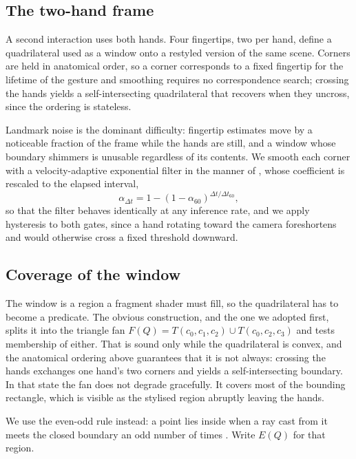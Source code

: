 \documentclass{article}
\theoremstyle{definition}
\begin{document}
\subsection{The two-hand frame}
\label{sec:frame}

A second interaction uses both hands. Four fingertips, two per hand, define a
quadrilateral used as a window onto a restyled version of the same scene. Corners
are held in anatomical order, so a corner corresponds to a fixed fingertip for
the lifetime of the gesture and smoothing requires no correspondence search;
crossing the hands yields a self-intersecting quadrilateral that recovers when
they uncross, since the ordering is stateless.

Landmark noise is the dominant difficulty: fingertip estimates move by a
noticeable fraction of the frame while the hands are still, and a window whose
boundary shimmers is unusable regardless of its contents. We smooth each corner
with a velocity-adaptive exponential filter in the manner of
\citet{casiez2012euro}, whose coefficient is rescaled to the elapsed interval,
\begin{equation}
  \alpha_{\Delta t} = 1 - (1 - \alpha_{60})^{\Delta t / \Delta t_{60}},
\end{equation}
so that the filter behaves identically at any inference rate, and we apply
hysteresis to both gates, since a hand rotating toward the camera foreshortens
and would otherwise cross a fixed threshold downward.


\subsection{Coverage of the window}
\label{sec:coverage}

The window is a region a fragment shader must fill, so the quadrilateral has to
become a predicate. The obvious construction, and the one we adopted first,
splits it into the triangle fan $F(Q) = T(c_0,c_1,c_2)\cup T(c_0,c_2,c_3)$ and
tests membership of either. That is sound only while the quadrilateral is
convex, and the anatomical ordering above guarantees that it is not always:
crossing the hands exchanges one hand's two corners and yields a
self-intersecting boundary. In that state the fan does not degrade gracefully.
It covers most of the bounding rectangle, which is visible as the stylised
region abruptly leaving the hands.

We use the even-odd rule instead: a point lies inside when a ray cast from it
meets the closed boundary an odd number of times \citep{haines1994point}. Write
$E(Q)$ for that region.
\end{document}
